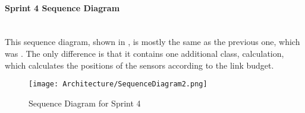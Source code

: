 \documentclass[../document.tex]{subfiles}
\begin{document}
\paragraph{Sprint 4 Sequence Diagram} \ \\
This sequence diagram, shown in , is mostly the same as the previous one, which was . The only difference is that it contains one additional class, calculation, which calculates the positions of the sensors according to the link budget.
\begin{figure}[H]
	\centering
	\texttt{[image: Architecture/SequenceDiagram2.png]}
	\caption{Sequence Diagram for Sprint 4}
	\label{fig:SequenceDiagram2}
\end{figure}
\end{document}
